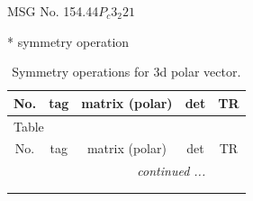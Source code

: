 \documentclass[fleqn,8pt]{jsarticle}
\begin{document}
\setcounter{MaxMatrixCols}{32}

\renewcommand{\tablename}{Table~}
\renewcommand{\figurename}{Figure~}
\begin{center}
\LARGE
MSG No. 154.44\quad$P_{c}3_{2}21$
\end{center}
* symmetry operation
\renewcommand{\arraystretch}{1.3}
\begin{longtable}{ccccc}
\caption{Symmetry operations for 3d polar vector.}
 \\
 \hline \hline
No. & tag & matrix (polar) & det & TR \\ \hline \endfirsthead

\multicolumn{4}{l}{\tablename\ \thetable{}} \\
 \hline \hline
No. & tag & matrix (polar) & det & TR \\ \hline \endhead

 \hline \hline
\multicolumn{4}{r}{\footnotesize\it continued ...} \\ \endfoot

 \hline \hline
\multicolumn{4}{r}{} \\ \endlastfoot


\end{longtable}
\end{document}

